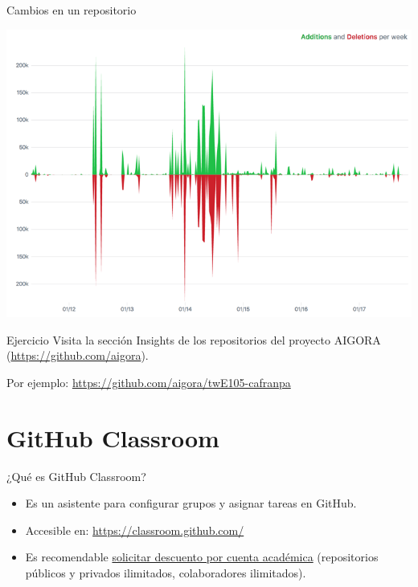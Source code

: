 \documentclass[aspectratio=169, xcolor={usenames,svgnames,dvipsnames}]{beamer}
\begin{document}
\begin{frame}[label={sec:orgb099f60}]{Cambios en un repositorio}
\begin{center}
\includegraphics[width=.9\linewidth]{figs/repo_code_frequency_graph_dotcom.png}
\end{center}
\end{frame}

\begin{frame}[label={sec:org177d9e1}]{}
\begin{block}{Ejercicio}
Visita la sección Insights de los repositorios del proyecto AIGORA (\url{https://github.com/aigora}). 

Por ejemplo: \url{https://github.com/aigora/twE105-cafranpa}
\end{block}
\end{frame}

\section{GitHub Classroom}
\label{sec:org30e66c8}

\begin{frame}[label={sec:org6e71c90}]{¿Qué es GitHub Classroom?}
\begin{itemize}
\item Es un asistente para configurar grupos y asignar tareas en GitHub.

\item Accesible en: \url{https://classroom.github.com/}

\item Es recomendable \href{https://help.github.com/en/articles/applying-for-an-educator-or-researcher-discount}{solicitar descuento por cuenta académica} (repositorios públicos y privados ilimitados, colaboradores ilimitados).
\end{itemize}
\end{frame}
\end{document}
